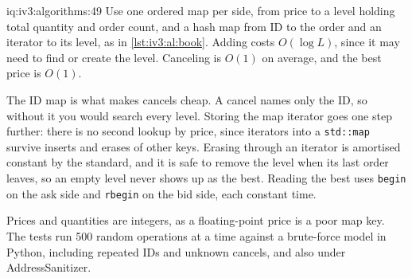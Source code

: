 \begin{solution}{iq:iv3:algorithms:49}
Use one ordered map per side, from price to a level holding total quantity and order count, and a hash map from ID to the order and an iterator to its level, as in \cref{lst:iv3:al:book}. Adding costs $O(\log L)$, since it may need to find or create the level. Canceling is $O(1)$ on average, and the best price is $O(1)$.
\label{lst:iv3:al:book}

The ID map is what makes cancels cheap. A cancel names only the ID, so without it you would search every level. Storing the map iterator goes one step further: there is no second lookup by price, since iterators into a \texttt{std::map} survive inserts and erases of other keys. Erasing through an iterator is amortised constant by the standard, and it is safe to remove the level when its last order leaves, so an empty level never shows up as the best. Reading the best uses \texttt{begin} on the ask side and \texttt{rbegin} on the bid side, each constant time.

Prices and quantities are integers, as a floating-point price is a poor map key. The tests run 500 random operations at a time against a brute-force model in Python, including repeated IDs and unknown cancels, and also under AddressSanitizer.

\end{solution}

